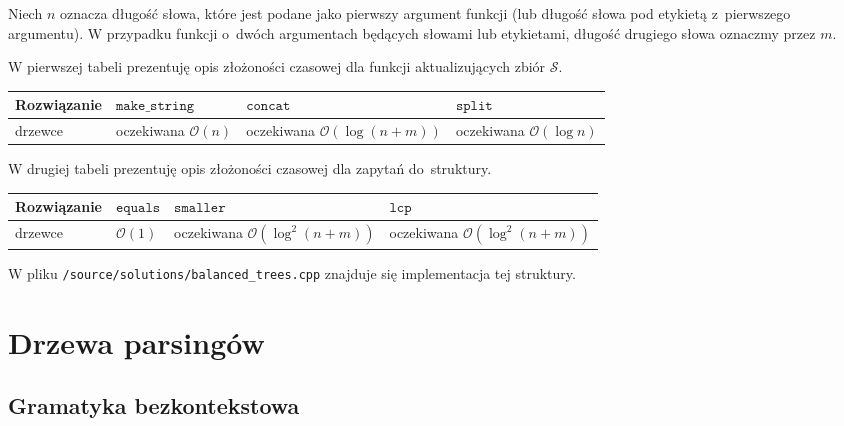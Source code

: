 \documentclass[declaration,shortabstract]{iithesis}
\theoremstyle{definition} \newtheorem{definition}{Definicja}[chapter]
\theoremstyle{plain} \newtheorem{remark}[definition]{Obserwacja}
\theoremstyle{plain} \newtheorem{theorem}[definition]{Twierdzenie}
\theoremstyle{plain} \newtheorem{example}{Przykład}[definition]
\theoremstyle{plain} \newtheorem{lemma}[definition]{Lemat}
\begin{document}
Niech $n$ oznacza długość słowa, które jest podane jako pierwszy argument funkcji (lub długość słowa pod etykietą z~pierwszego argumentu). W przypadku funkcji o~dwóch argumentach będących słowami lub etykietami, długość drugiego słowa oznaczmy przez $m$.

W pierwszej tabeli prezentuję opis złożoności czasowej dla funkcji aktualizujących zbiór $\mathcal{S}$.

\begin{center}
    \begin{tabular}{ | m{3cm} | >{\centering\arraybackslash}m{3cm} | >{\centering\arraybackslash}m{3cm} | >{\centering\arraybackslash}m{3cm} | }
        \hline 
        Rozwiązanie & $\texttt{make\_string}$ & $\texttt{concat}$ & $\texttt{split}$ \\
        \hline
        drzewce & oczekiwana $\mathcal{O}(n)$ & oczekiwana $\mathcal{O}(\log(n + m))$ & oczekiwana $\mathcal{O}(\log n)$ \\
        \hline
    \end{tabular}
\end{center}

W drugiej tabeli prezentuję opis złożoności czasowej dla zapytań do~struktury.

\begin{center}
    \begin{tabular}{ | m{3cm} | >{\centering\arraybackslash}m{3cm} | >{\centering\arraybackslash}m{3cm} | >{\centering\arraybackslash}m{3cm} | }
        \hline 
        Rozwiązanie & $\texttt{equals}$ & $\texttt{smaller}$ & $\texttt{lcp}$ \\
        \hline
        drzewce & $\mathcal{O}(1)$ & oczekiwana $\mathcal{O}(\log^2(n + m))$ & oczekiwana $\mathcal{O}(\log^2(n + m))$ \\
        \hline
    \end{tabular}
\end{center}

W pliku \texttt{/source/solutions/balanced\_trees.cpp} znajduje się implementacja tej struktury.

\section{Drzewa parsingów}

\subsection{Gramatyka bezkontekstowa}
\end{document}
